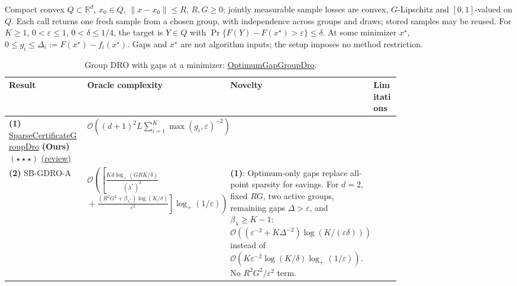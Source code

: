 \begin{table}[tp]
\centering
\caption{Group DRO with gaps at a minimizer: \href{https://github.com/k3nfalt/longtails/blob/main/LongTails/Setups/OptimumGapGroupDro.lean}{OptimumGapGroupDro}.}\label{tab:OptimumGapGroupDro}
\parbox{\linewidth}{\footnotesize Compact convex $Q\subset\mathbb R^d$, $x_0\in Q$, $\|x-x_0\|\le R$, $R,G\ge0$; jointly measurable sample losses are convex, $G$-Lipschitz and $[0,1]$-valued on $Q$. Each call returns one fresh sample from a chosen group, with independence across groups and draws; stored samples may be reused. For $K\ge1$, $0<\varepsilon\le1$, $0<\delta\le1/4$, the target is $Y\in Q$ with $\Pr\{F(Y)-F(x^\star)>\varepsilon\}\le\delta$. At some minimizer $x^\star$, $0\le g_i\le\Delta_i:=F(x^\star)-f_i(x^\star)$. Gaps and $x^\star$ are not algorithm inputs; the setup imposes no method restriction.}\par\smallskip
\begin{threeparttable}
\footnotesize
\setlength{\tabcolsep}{4pt}\renewcommand{\arraystretch}{1.25}
\begin{tabularx}{\linewidth}{@{}>{\raggedright\arraybackslash}p{0.20\linewidth}>{\raggedright\arraybackslash}p{0.32\linewidth}>{\raggedright\arraybackslash}p{0.25\linewidth}>{\raggedright\arraybackslash}X@{}}
\toprule
\textbf{Result} & \textbf{Oracle complexity} & \textbf{Novelty} & \textbf{Limitations} \\
\midrule
\textbf{(1)} \href{https://github.com/k3nfalt/longtails/blob/main/LongTails/Theorems/SparseCertificateGroupDro.lean}{Sparse\allowbreak Certificate\allowbreak Group\allowbreak Dro} \textbf{(Ours)} $(\star\star\star)$ \href{https://github.com/k3nfalt/longtails/blob/main/scripts/reviews/SparseCertificateGroupDro.md}{(review)}
& $\mathcal{O}\!\left((d+1)^2 L\sum_{i=1}^K\max(g_i,\varepsilon)^{-2}\right)$ & & \\
\midrule[1.2pt]
\textbf{(2)} SB-GDRO-A \citep[Thm.~4.1]{ogNguyen2025v2}
& $\mathcal{O}\!\left(\left[\frac{Kd\log_+(GRK/\delta)}{(\lambda^*)^2}\right.\right.$\newline
$\left.\left.{}+\frac{(R^2G^2+\beta_{\lambda^*})\log(K/\delta)}{\varepsilon^2}\right]\log_+(1/\varepsilon)\right)$
& \textbf{(1)}: Optimum-only gaps replace all-point sparsity for savings. For $d=2$, fixed $RG$, two active groups, remaining gaps $\Delta>\varepsilon$, and $\beta_\lambda\ge K-1$: $\mathcal{O}((\varepsilon^{-2}+K\Delta^{-2})\log(K/(\varepsilon\delta)))$ instead of $\mathcal{O}(K\varepsilon^{-2}\log(K/\delta)\log_+(1/\varepsilon))$. No $R^2G^2/\varepsilon^2$ term.

\end{tabularx}
\end{threeparttable}
\end{table}
